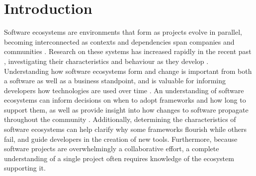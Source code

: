 \documentclass[10pt,conference]{IEEEtran}
\begin{document}
\section{Introduction}
Software ecosystems are environments that form as projects evolve in parallel,
becoming interconnected as contexts and dependencies span companies and communities \cite{LUNGU2010264}. 
Research on these systems has increased rapidly in the recent past \cite{Manikas:2017}, investigating
their characteristics and behaviour as they develop \cite{Manikas:2013}. Understanding how software
ecosystems form and change is important from both a software as well as a business standpoint\cite{Messerschmitt},
and is valuable for informing developers how technologies are used over time \cite{Serebrenik:2015}. 
An understanding of software ecosystems can inform decisions on when to adopt frameworks and how long
to support them, as well as provide insight into how changes to software propagate throughout the community \cite{Wittern:2016}.
Additionally, determining the characteristics of software ecosystems 
can help clarify why some frameworks flourish while others fail, and guide 
developers in the creation of new tools\cite{Serebrenik:2015}. Furthermore, 
because software projects are overwhelmingly a collaborative effort, a complete
understanding of a single project often requires knowledge of the ecosystem supporting it\cite{Blincoe:2015}.
\end{document}
